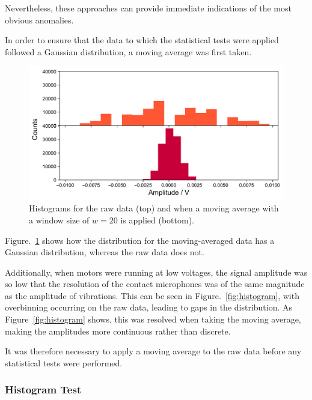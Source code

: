 Nevertheless, these approaches can provide immediate indications of the most obvious anomalies. 

In order to ensure that the data to which the statistical tests were applied followed a Gaussian distribution, a moving average was first taken.

\begin{figure}[t]
    \includegraphics[width=1.0\textwidth]{fig/moving_av_hist.pdf}
    \caption[Moving Average Histogram]{Histograms for the raw data (top) and when a moving average with a window size of $w=20$ is applied (bottom).}
    \label{fig:move_av_hist}
\end{figure}

Figure.~\ref{fig:move_av_hist} shows how the distribution for the moving-averaged data has a Gaussian distribution, whereas the raw data does not.

Additionally, when motors were running at low voltages, the signal amplitude was so low that the resolution of the contact microphones was of the same magnitude as the amplitude of vibrations. This can be seen in Figure.~\ref{fig:histogram}, with overbinning occurring on the raw data, leading to gaps in the distribution. As Figure~\ref{fig:histogram} shows, this was resolved when taking the moving average, making the amplitudes more continuous rather than discrete.

It was therefore necessary to apply a moving average to the raw data before any statistical tests were performed.

\subsubsection{Histogram Test}

